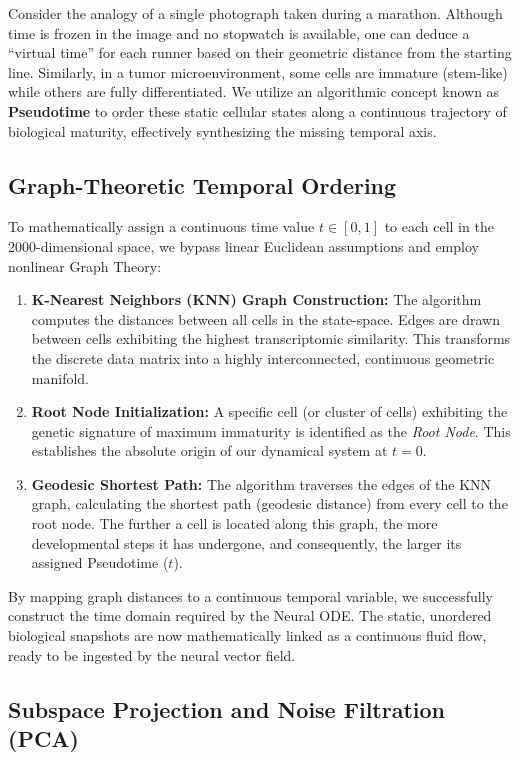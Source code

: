 \documentclass[12pt, a4paper]{article}
\begin{document}
	Consider the analogy of a single photograph taken during a marathon. Although time is frozen in the image and no stopwatch is available, one can deduce a ``virtual time'' for each runner based on their geometric distance from the starting line. Similarly, in a tumor microenvironment, some cells are immature (stem-like) while others are fully differentiated. We utilize an algorithmic concept known as \textbf{Pseudotime} to order these static cellular states along a continuous trajectory of biological maturity, effectively synthesizing the missing temporal axis.
	
	\subsection{Graph-Theoretic Temporal Ordering}
	To mathematically assign a continuous time value $t \in [0, 1]$ to each cell in the 2000-dimensional space, we bypass linear Euclidean assumptions and employ nonlinear Graph Theory:
	
	\begin{enumerate}
		\item \textbf{K-Nearest Neighbors (KNN) Graph Construction:} The algorithm computes the distances between all cells in the state-space. Edges are drawn between cells exhibiting the highest transcriptomic similarity. This transforms the discrete data matrix into a highly interconnected, continuous geometric manifold.
		\item \textbf{Root Node Initialization:} A specific cell (or cluster of cells) exhibiting the genetic signature of maximum immaturity is identified as the \textit{Root Node}. This establishes the absolute origin of our dynamical system at $t = 0$.
		\item \textbf{Geodesic Shortest Path:} The algorithm traverses the edges of the KNN graph, calculating the shortest path (geodesic distance) from every cell to the root node. The further a cell is located along this graph, the more developmental steps it has undergone, and consequently, the larger its assigned Pseudotime ($t$).
	\end{enumerate}
	
	By mapping graph distances to a continuous temporal variable, we successfully construct the time domain required by the Neural ODE. The static, unordered biological snapshots are now mathematically linked as a continuous fluid flow, ready to be ingested by the neural vector field.
	
	\subsection{Subspace Projection and Noise Filtration (PCA)}
	
\end{document}
